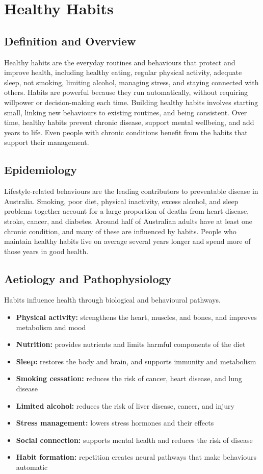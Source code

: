 \chapter{Healthy Habits}

\section*{Definition and Overview}
Healthy habits are the everyday routines and behaviours that protect and improve health, including healthy eating, regular physical activity, adequate sleep, not smoking, limiting alcohol, managing stress, and staying connected with others. Habits are powerful because they run automatically, without requiring willpower or decision-making each time. Building healthy habits involves starting small, linking new behaviours to existing routines, and being consistent. Over time, healthy habits prevent chronic disease, support mental wellbeing, and add years to life. Even people with chronic conditions benefit from the habits that support their management.

\section*{Epidemiology}
Lifestyle-related behaviours are the leading contributors to preventable disease in Australia. Smoking, poor diet, physical inactivity, excess alcohol, and sleep problems together account for a large proportion of deaths from heart disease, stroke, cancer, and diabetes. Around half of Australian adults have at least one chronic condition, and many of these are influenced by habits. People who maintain healthy habits live on average several years longer and spend more of those years in good health.

\section*{Aetiology and Pathophysiology}
Habits influence health through biological and behavioural pathways.

\begin{itemize}
    \item \textbf{Physical activity:} strengthens the heart, muscles, and bones, and improves metabolism and mood
    \item \textbf{Nutrition:} provides nutrients and limits harmful components of the diet
    \item \textbf{Sleep:} restores the body and brain, and supports immunity and metabolism
    \item \textbf{Smoking cessation:} reduces the risk of cancer, heart disease, and lung disease
    \item \textbf{Limited alcohol:} reduces the risk of liver disease, cancer, and injury
    \item \textbf{Stress management:} lowers stress hormones and their effects
    \item \textbf{Social connection:} supports mental health and reduces the risk of disease
    \item \textbf{Habit formation:} repetition creates neural pathways that make behaviours automatic
\end{itemize}

